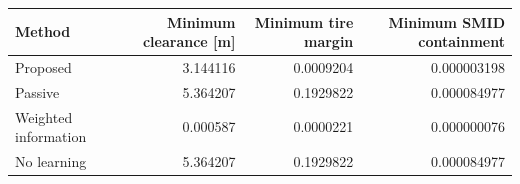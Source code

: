 \begin{tabular}{lrrr}
\toprule
Method & Minimum clearance [m] & Minimum tire margin & Minimum SMID containment \\
\midrule
Proposed & 3.144116 & 0.0009204 & 0.000003198 \\
Passive & 5.364207 & 0.1929822 & 0.000084977 \\
Weighted information & 0.000587 & 0.0000221 & 0.000000076 \\
No learning & 5.364207 & 0.1929822 & 0.000084977 \\
\bottomrule
\end{tabular}
